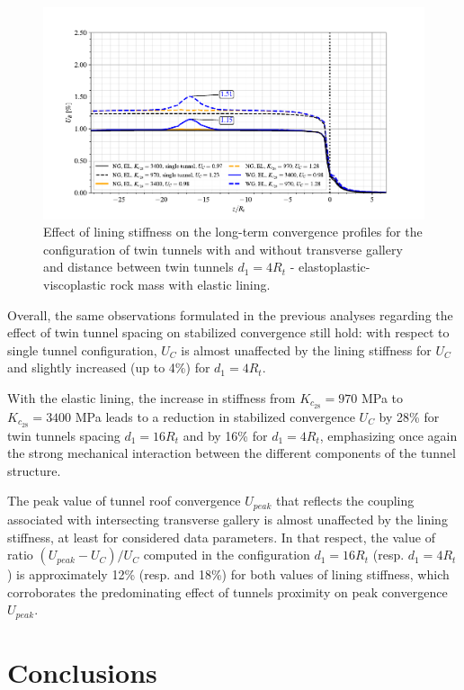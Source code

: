 \documentclass[Journal,letterpaper, NoLists,SectionNumbers]{ascelike-new}
\begin{document}
\begin{figure}[h!]
	\centering
	\includegraphics[scale=0.9]{Convergence Profiles - EPVP_EL_VEL_d1_4Ri_anotate.pdf}
	\caption{Effect of lining stiffness on the long-term convergence profiles for the configuration of twin tunnels with and without transverse gallery and distance between twin tunnels $d_1=4R_t$ - elastoplastic-viscoplastic rock mass with elastic lining.}
	\label{EPVP_EL_VEL_d1_4Ri}
\end{figure}

Overall, the same observations formulated in the previous analyses regarding the effect of twin tunnel spacing on stabilized convergence still hold: with respect to single tunnel configuration, $U_C$ is almost unaffected by the lining stiffness for $U_C$  and slightly increased (up to 4\%) for $d_1=4R_t$.

With the elastic lining, the increase in stiffness from $K_{c_{28}}=970$ MPa to $K_{c_{28}}=3400$ MPa leads to a reduction in stabilized convergence $U_C$ by 28\% for twin tunnels spacing  $d_1=16R_t$ and by 16\% for $d_1=4R_t$, emphasizing once again the strong mechanical interaction between the different components of the tunnel structure.

The peak value of tunnel roof convergence $U_{peak}$ that reflects the coupling associated with intersecting transverse gallery is almost unaffected by the lining stiffness, at least for considered data parameters. In that respect, the value of ratio $(U_{peak}-U_C)/U_C$ computed in the configuration $d_1=16R_t$ (resp. $d_1=4R_t$) is  approximately 12\% (resp. and 18\%) for both values of lining stiffness, which corroborates the predominating effect of tunnels proximity on peak convergence $U_{peak}$. 

\section{Conclusions}\label{}
\end{document}
